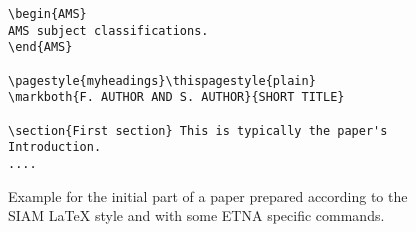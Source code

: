 \documentclass{scrartcl}
\begin{document}
\begin{figure}
\begin{verbatim}
\begin{AMS}
AMS subject classifications.
\end{AMS}

\pagestyle{myheadings}\thispagestyle{plain}
\markboth{F. AUTHOR AND S. AUTHOR}{SHORT TITLE}

\section{First section} This is typically the paper's Introduction.
....
\end{verbatim}
\caption{Example for the initial part of a paper prepared according to the
SIAM {\LaTeX} style and with some ETNA specific commands.}\label{fig:preamble}
\end{figure}
\end{document}
